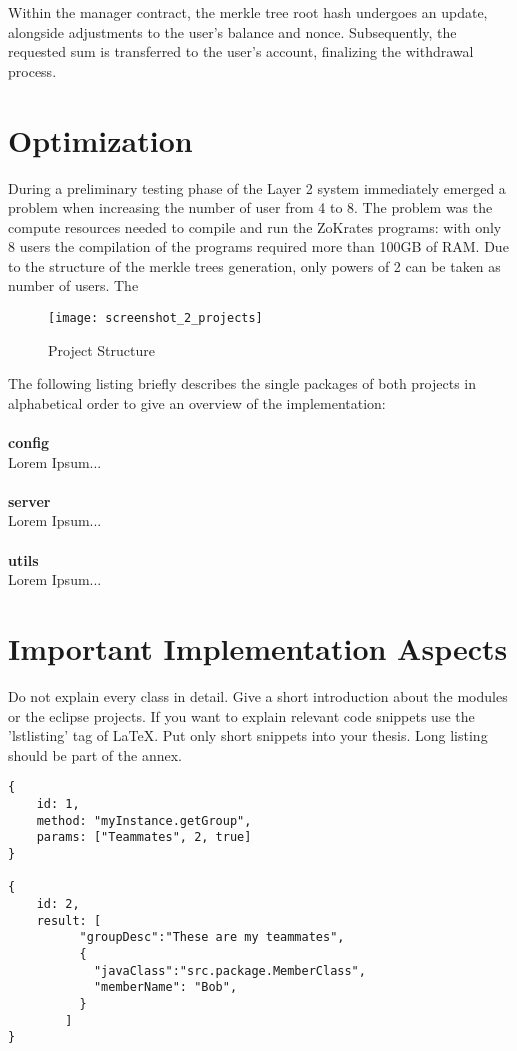  Within the manager contract, the merkle tree root hash undergoes an update, alongside adjustments to the user's balance and nonce. Subsequently, the requested sum is transferred to the user's account, finalizing the withdrawal process.
  


\section{Optimization}
During a preliminary testing phase of the Layer 2 system immediately emerged a problem when increasing the number of user from 4 to 8. The problem was the compute resources needed to compile and run the ZoKrates programs: with only 8 users the compilation of the programs required more than 100GB of RAM. Due to the structure of the merkle trees generation, only powers of 2 can be taken as number of users. The 

\begin{figure}[htb]
  \centering
  \texttt{[image: screenshot\_2\_projects]}
  \caption{Project Structure}
  \label{fig:projects}
\end{figure}

\noindent
The following listing briefly describes the single packages of both projects in alphabetical order to give an overview of the implementation:
\\
\\
\textbf{config} 
\\
Lorem Ipsum...
\\
\\
\textbf{server} 
\\
Lorem Ipsum...
\\
\\
\textbf{utils} 
\\
Lorem Ipsum...

\section{Important Implementation Aspects\label{sec:implaspects}}

Do not explain every class in detail. Give a short introduction about the modules or the eclipse projects. If you want to explain relevant code snippets use the 'lstlisting' tag of LaTeX. Put only short snippets into your thesis. Long listing should be part of the annex.

\lstset{caption=JSON String Code Snippet,label=jsonstring,showstringspaces=false}
\begin{lstlisting}
{
	id: 1,
	method: "myInstance.getGroup",
	params: ["Teammates", 2, true]
}

{
	id: 2,
	result: [
		  "groupDesc":"These are my teammates",
		  {
			"javaClass":"src.package.MemberClass",
			"memberName": "Bob",      
		  }
		]
}\end{lstlisting}

